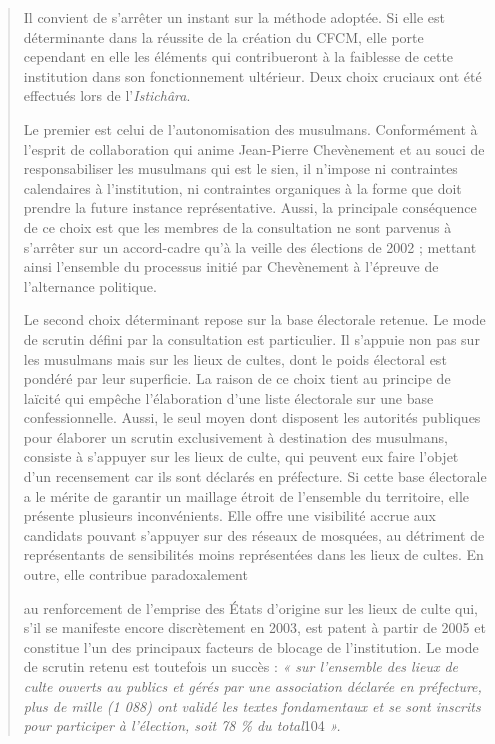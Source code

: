 \begin{quote}
Il convient de s'arrêter un instant sur la méthode adoptée. Si elle est
déterminante dans la réussite de la création du CFCM, elle porte
cependant en elle les éléments qui contribueront à la faiblesse de cette
institution dans son fonctionnement ultérieur. Deux choix cruciaux ont
été effectués lors de l'\emph{Istichâra}.

Le premier est celui de l'autonomisation des musulmans. Conformément à
l'esprit de collaboration qui anime Jean-Pierre Chevènement et au souci
de responsabiliser les musulmans qui est le sien, il n'impose ni
contraintes calendaires à l'institution, ni contraintes organiques à la
forme que doit prendre la future instance représentative. Aussi, la
principale conséquence de ce choix est que les membres de la
consultation ne sont parvenus à s'arrêter sur un accord-cadre qu'à la
veille des élections de 2002 ; mettant ainsi l'ensemble du processus
initié par Chevènement à l'épreuve de l'alternance politique.

Le second choix déterminant repose sur la base électorale retenue. Le
mode de scrutin défini par la consultation est particulier. Il s'appuie
non pas sur les musulmans mais sur les lieux de cultes, dont le poids
électoral est pondéré par leur superficie. La raison de ce choix tient
au principe de laïcité qui empêche l'élaboration d'une liste électorale
sur une base confessionnelle. Aussi, le seul moyen dont disposent les
autorités publiques pour élaborer un scrutin exclusivement à destination
des musulmans, consiste à s'appuyer sur les lieux de culte, qui peuvent
eux faire l'objet d'un recensement car ils sont déclarés en préfecture.
Si cette base électorale a le mérite de garantir un maillage étroit de
l'ensemble du territoire, elle présente plusieurs inconvénients. Elle
offre une visibilité accrue aux candidats pouvant s'appuyer sur des
réseaux de mosquées, au détriment de représentants de sensibilités moins
représentées dans les lieux de cultes. En outre, elle contribue
paradoxalement



au renforcement de l'emprise des États d'origine sur les lieux de culte
qui, s'il se manifeste encore discrètement en 2003, est patent à partir
de 2005 et constitue l'un des principaux facteurs de blocage de
l'institution. Le mode de scrutin retenu est toutefois un succès :
\emph{« sur l'ensemble des lieux de culte ouverts au publics et gérés
par une association déclarée en préfecture, plus de mille (1 088) ont
validé les textes fondamentaux et se sont inscrits pour participer à
l'élection, soit 78 \% du total}104 \emph{».}
\end{quote}

